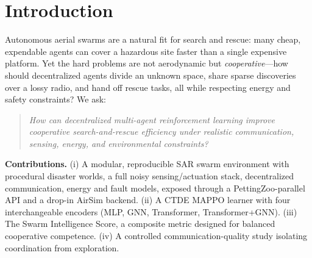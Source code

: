 \documentclass[conference]{IEEEtran}
\begin{document}
\section{Introduction}
Autonomous aerial swarms are a natural fit for search and rescue: many cheap,
expendable agents can cover a hazardous site faster than a single expensive
platform. Yet the hard problems are not aerodynamic but \emph{cooperative}---how
should decentralized agents divide an unknown space, share sparse discoveries over
a lossy radio, and hand off rescue tasks, all while respecting energy and safety
constraints? We ask:
\begin{quote}
\emph{How can decentralized multi-agent reinforcement learning improve cooperative
search-and-rescue efficiency under realistic communication, sensing, energy, and
environmental constraints?}
\end{quote}

\noindent\textbf{Contributions.}
(i) A modular, reproducible SAR swarm environment with procedural disaster worlds,
a full noisy sensing/actuation stack, decentralized communication, energy and
fault models, exposed through a PettingZoo-parallel API and a drop-in AirSim
backend. (ii) A CTDE MAPPO learner with four interchangeable encoders
(MLP, GNN, Transformer, Transformer+GNN). (iii) The Swarm Intelligence Score, a
composite metric designed for balanced cooperative competence. (iv) A controlled
communication-quality study isolating coordination from exploration.
\end{document}
